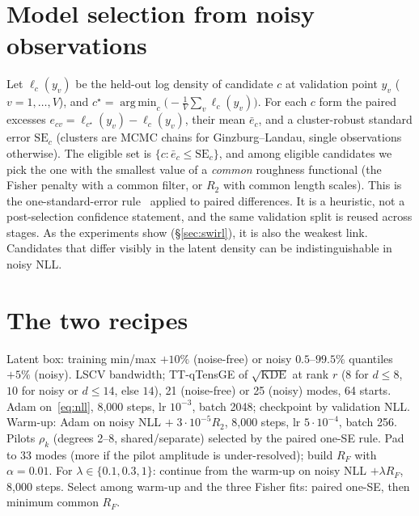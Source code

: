 \documentclass[11pt]{article}
\theoremstyle{definition}
\theoremstyle{remark}
\DeclareMathOperator*{\argmin}{arg\,min}
\begin{document}
\section{Model selection from noisy observations}
\label{sec:select}

Let $\ell_c(y_v)$ be the held-out log density of candidate $c$ at validation point $y_v$ ($v=1,\dots,V$), and
$c^\star=\argmin_c\bigl(-\frac1V\sum_v\ell_c(y_v)\bigr)$. For each $c$ form the paired excesses
$e_{cv}=\ell_{c^\star}(y_v)-\ell_c(y_v)$, their mean $\bar e_c$, and a cluster-robust standard error $\mathrm{SE}_c$
(clusters are MCMC chains for Ginzburg--Landau, single observations otherwise). The eligible set is
$\{c:\bar e_c\le \mathrm{SE}_c\}$, and among eligible candidates we pick the one with the smallest value of a
\emph{common} roughness functional (the Fisher penalty with a common filter, or $R_2$ with common length scales).
This is the one-standard-error rule~\cite{hastie2009elements} applied to paired differences. It is a heuristic,
not a post-selection confidence statement, and the same validation split is reused across stages. As the
experiments show (\S\ref{sec:swirl}), it is also the weakest link. Candidates that differ visibly in the latent
density can be indistinguishable in noisy NLL.

\section{The two recipes}
\label{sec:recipes}

\begin{algorithm}[H]
\caption{Gallery recipe for Ginzburg--Landau (\texttt{scripts/refresh\_density\_fits.py})}
\label{alg:gl}
\begin{algorithmic}[1]
\STATE Latent box: training min/max $+10\%$ (noise-free) or noisy $0.5$--$99.5\%$ quantiles $+5\%$ (noisy).
\STATE LSCV bandwidth; TT-qTensGE of $\sqrt{\mathrm{KDE}}$ at rank $r$ ($8$ for $d\le 8$, $10$ for noisy or $d\le14$, else $14$), 21 (noise-free) or 25 (noisy) modes, 64 starts.
  \STATE Adam on~\eqref{eq:nll}, 8{,}000 steps, lr $10^{-3}$, batch 2048; checkpoint by validation NLL.
\ELSE
  \STATE Warm-up: Adam on noisy NLL $+\;3\cdot10^{-5}R_2$, 8{,}000 steps, lr $5\cdot10^{-4}$, batch 256.
  \STATE Pilots $\rho_k$ (degrees 2--8, shared/separate) selected by the paired one-SE rule.
  \STATE Pad to 33 modes (more if the pilot amplitude is under-resolved); build $R_F$ with $\alpha=0.01$.
  \STATE For $\lambda\in\{0.1,0.3,1\}$: continue from the warm-up on noisy NLL $+\lambda R_F$, 8{,}000 steps.
  \STATE Select among warm-up and the three Fisher fits: paired one-SE, then minimum common $R_F$.
\ENDIF
\end{algorithmic}
\end{algorithm}
\end{document}
